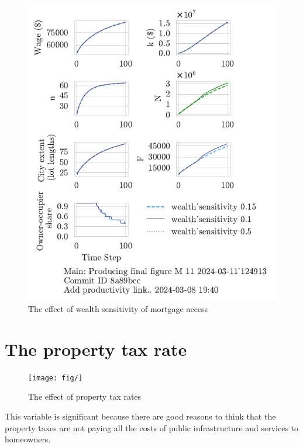 \begin{figure}
    \centering
    \includegraphics[scale=.8, trim={0 1.4cm 0 0},clip]{fig/wealth_sensitivity-124913.pdf}
    \caption{The effect of wealth sensitivity of mortgage access}
    \label{fig:wealth_sensitivity_ownership_trajectory}
\end{figure}

\newpage
\section{The property tax rate}

\begin{figure}
    \centering
    \texttt{[image: fig/]}
    \caption{The effect of property tax rates}
    \label{fig:}
\end{figure}
This variable is significant because there are good reasons to think that the property taxes are not paying all the costs of public infrastructure and services to homeowners.